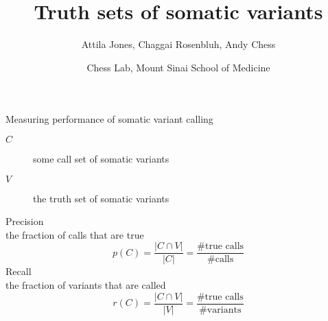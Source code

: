 \documentclass{beamer}
\title{Truth sets of somatic variants}
\author{Attila Jones, Chaggai Rosenbluh, Andy Chess}
\date{Chess Lab, Mount Sinai School of Medicine}
\begin{document}
\maketitle

\begin{frame}{Measuring performance of somatic variant calling}
\begin{description}
\item [\(C\)] some call set of somatic variants
\item [\(V\)] the truth set of somatic variants
\end{description}
\vfill
\alert{Precision}\\
the fraction of calls that are true
\begin{equation}
p(C) = \frac{|C \cap V|}{|C|} = \frac{\#\text{true calls}}{\#\mathrm{calls}}
\end{equation}
\alert{Recall}\\
the fraction of variants that are called
\begin{equation}
r(C) = \frac{|C \cap V|}{|V|} = \frac{\#\text{true calls}}{\#\mathrm{variants}}
\end{equation}
\end{frame}
\end{document}

